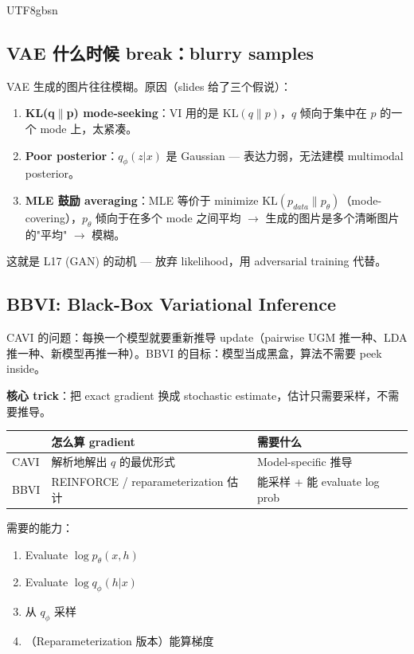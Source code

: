 \documentclass[11pt]{article}
\begin{document}
\begin{CJK}{UTF8}{gbsn}
\subsection{VAE 什么时候 break：blurry samples}

VAE 生成的图片往往模糊。原因（slides 给了三个假说）：

\begin{enumerate}
  \item \textbf{KL(q$\|$p) mode-seeking}：VI 用的是 $\mathrm{KL}(q\|p)$，$q$ 倾向于集中在 $p$ 的一个 mode 上，太紧凑。
  \item \textbf{Poor posterior}：$q_\phi(z|x)$ 是 Gaussian --- 表达力弱，无法建模 multimodal posterior。
  \item \textbf{MLE 鼓励 averaging}：MLE 等价于 minimize $\mathrm{KL}(p_{data}\|p_\theta)$（mode-covering），$p_\theta$ 倾向于在多个 mode 之间平均 $\to$ 生成的图片是多个清晰图片的"平均" $\to$ 模糊。
\end{enumerate}

这就是 L17 (GAN) 的动机 --- 放弃 likelihood，用 adversarial training 代替。

\subsection{BBVI: Black-Box Variational Inference}

CAVI 的问题：每换一个模型就要重新推导 update（pairwise UGM 推一种、LDA 推一种、新模型再推一种）。BBVI 的目标：模型当成黑盒，算法不需要 peek inside。

\textbf{核心 trick}：把 exact gradient 换成 stochastic estimate，估计只需要采样，不需要推导。

\begin{center}
\begin{tabular}{l|l|l}
  & \textbf{怎么算 gradient} & \textbf{需要什么} \\
  \hline
  CAVI & 解析地解出 $q$ 的最优形式 & Model-specific 推导 \\
  BBVI & REINFORCE / reparameterization 估计 & 能采样 + 能 evaluate log prob \\
\end{tabular}
\end{center}

需要的能力：
\begin{enumerate}[nosep]
  \item Evaluate $\log p_\theta(x, h)$
  \item Evaluate $\log q_\phi(h|x)$
  \item 从 $q_\phi$ 采样
  \item （Reparameterization 版本）能算梯度
\end{enumerate}


\end{CJK}
\end{document}
